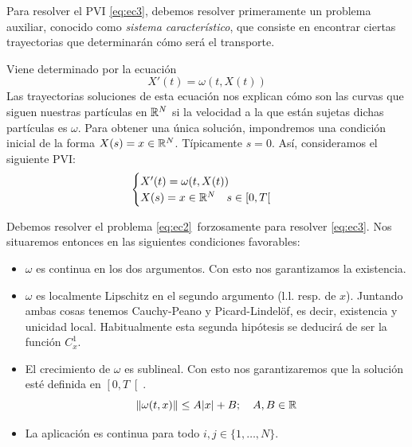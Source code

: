 Para resolver el PVI \eqref{eq:ec3}, debemos resolver primeramente un problema auxiliar, conocido como \textit{sistema característico}, que consiste en
encontrar ciertas trayectorias que determinarán cómo será el transporte.

\newpage

\begin{definicion}
    Viene determinado por la ecuación $$X'(t) = \omega(t,X(t))$$
    Las trayectorias soluciones de esta ecuación nos explican cómo son las curvas que siguen nuestras partículas en $\mathbb{R}^N$ si
    la velocidad a la que están sujetas dichas partículas es $\omega$. Para obtener una única solución, impondremos una condición inicial de la forma
    $X(s) = x \in \mathbb{R}^N$. Típicamente $s=0$. Así, consideramos el siguiente PVI:
    \begin{equation}\label{eq:ec2}
        \begin{cases}
            X'(t) = \omega(t,X(t)) \\
            X(s) = x \in \mathbb{R}^N \quad s \in \left[0, T \right[
        \end{cases}
    \end{equation}
\end{definicion}

Debemos resolver el problema \eqref{eq:ec2}~forzosamente para resolver \eqref{eq:ec3}. Nos situaremos entonces en las siguientes condiciones favorables:
\begin{itemize}
    \item[(H1)] $\omega$ es continua en los dos argumentos. Con esto nos garantizamos la existencia.
    \item[(H2)] $\omega$ es localmente Lipschitz en el segundo argumento (l.l. resp. de $x$). Juntando ambas cosas tenemos Cauchy-Peano y Picard-Lindelöf, es decir,
    existencia y unicidad local. Habitualmente esta segunda hipótesis se deducirá de ser la función $C_x^1$.
    \item[(H3)] El crecimiento de $\omega$ es sublineal. Con esto nos garantizaremos que la solución esté definida en $\left[0, T\right[$.
    $$\left\lVert \omega(t,x) \right\rVert \leq A|x| + B; \quad A,B \in \mathbb{R}$$
    \item[(H4)] La aplicación \Func{\dfrac{\partial \omega_i}{\partial x_j}}{\left[0, T \right[ \times \R^N}{\R}{(t,x)}{\dfrac{\partial \omega_i}{\partial x_j}(t,x)} es continua para todo $i,j \in \{1, \ldots, N\}$.
\end{itemize} 

